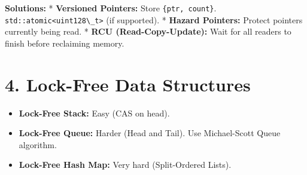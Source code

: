 \textbf{Solutions:} * \textbf{Versioned Pointers:} Store
\passthrough{\lstinline!\{ptr, count\}!}.
\passthrough{\lstinline!std::atomic<uint128\_t>!} (if supported). *
\textbf{Hazard Pointers:} Protect pointers currently being read. *
\textbf{RCU (Read-Copy-Update):} Wait for all readers to finish before
reclaiming memory.

\hypertarget{lock-free-data-structures}{%
\section{4. Lock-Free Data Structures}\label{lock-free-data-structures}}

\begin{itemize}
\tightlist
\item
  \textbf{Lock-Free Stack:} Easy (CAS on head).
\item
  \textbf{Lock-Free Queue:} Harder (Head and Tail). Use Michael-Scott
  Queue algorithm.
\item
  \textbf{Lock-Free Hash Map:} Very hard (Split-Ordered Lists).
\end{itemize}
